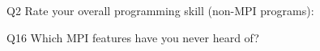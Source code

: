 \begin{description}%
\item{Q2} Rate your overall programming skill (non-MPI programs):%
\item{Q16} Which MPI features have you never heard of?%
\end{description}%
